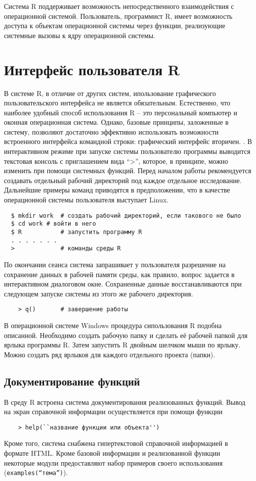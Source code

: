 \documentclass[12pt, openany, twoside]{book} %
\begin{document}
Система R поддерживает возможность непосредственного взаимодействия с операционной системой. Пользователь, программист R, имеет возможность доступа к объектам операционной системы через функции, реализующие системные вызовы к ядру операционной системы.

\section{Интерфейс пользователя R}
В системе R, в отличие от других систем, ипользование графического пользовательского интерфейса не является обязательным. Естественно, что наиболее удобный способ использования R – это персональный компьютер и оконная операционная система. Однако, базовые принципы, заложенные в систему, позволяют достаточно эффективно использовать возможности встроенного интерфейса командной строки: графический интерфейс вторичен.
.
В интерактивном режиме при запуске системы пользователю программы  выводится текстовая консоль с приглашением вида ``>'', которое, в принципе, можно изменить при помощи системных функций. Перед началом работы рекомендуется создавать отдельный рабочий директорий под каждое отдельное исследование. Дальнейшие примеры команд приводятся в предположении, что в качестве операционной системы пользователя выступает Linux.
{\tt\begin{verbatim}
  $ mkdir work 	# создать рабочий директорий, если такового не было
  $ cd work	# войти в него
  $ R			# запустить программу R
  . . . . . . .
  > 	 		# команды среды R
\end{verbatim}}
По окончании сеанса система запрашивает у пользователя разрешение на сохранение данных в рабочей памяти среды, как правило, вопрос задается в интерактивном диалоговом окне. Сохраненные данные восстанавливаются при следующем запуске системы из этого же рабочего директория.
{\tt\begin{verbatim}
	> q() 		# завершение работы
\end{verbatim}}

В операционной системе Windows процедура сипользования R подобна описанной. Необходимо создать рабочую папку и сделать её рабочей папкой для ярлыка программы R. Затем  запустить R двойным шелчком мыши по ярлыку. Можно создать ряд ярлыков для каждого отдельного проекта (папки).

\subsection{Документирование функций}
В среду R встроена система документирования реализованных функций. Вывод на экран справочной информации осуществляется при помощи функции
{\tt\begin{verbatim}
	> help(``название функции или объекта'')
\end{verbatim}}
Кроме того, система снабжена гипертекстовой справочной информацией в формате HTML.
Кроме базовой информации и реализованной функции некоторые модули предоставляют набор примеров своего использования (\texttt{examples(``тема'')}).
\end{document}
